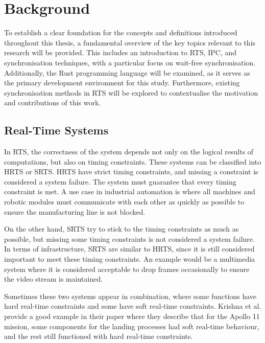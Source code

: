 \chapter{Background}\label{ch:background}

To establish a clear foundation for the concepts and definitions introduced throughout this thesis, a fundamental overview of the key topics relevant to this research will be provided. This includes an introduction to \ac{RTS}, \acf{IPC}, and synchronisation techniques, with a particular focus on wait-free synchronisation. Additionally, the Rust programming language will be examined, as it serves as the primary development environment for this study. Furthermore, existing synchronisation methods in \ac{RTS} will be explored to contextualise the motivation and contributions of this work.

\section{Real-Time Systems}\label{sec:real-time}

In \ac{RTS}, the correctness of the system depends not only on the logical results of computations, but also on timing constraints. These systems can be classified into \ac{HRTS} or \ac{SRTS}. \ac{HRTS} have strict timing constraints, and missing a constraint is considered a system failure. The system must guarantee that every timing constraint is met. A use case in industrial automation is where all machines and robotic modules must communicate with each other as quickly as possible to ensure the manufacturing line is not blocked. \cite{HardSoftRealTime}

On the other hand, \ac{SRTS} try to stick to the timing constraints as much as possible, but missing some timing constraints is not considered a system failure. In terms of infrastructure, \ac{SRTS} are similar to \ac{HRTS}, since it is still considered important to meet these timing constraints. An example would be a multimedia system where it is considered acceptable to drop frames occasionally to ensure the video stream is maintained. \cite{HardSoftRealTime}

Sometimes these two systems appear in combination, where some functions have hard real-time constraints and some have soft real-time constraints. Krishna et al. provide a good example in their paper where they describe that for the Apollo 11 mission, some components for the landing processes had soft real-time behaviour, and the rest still functioned with hard real-time constraints. \cite{HardSoftRealTime}

